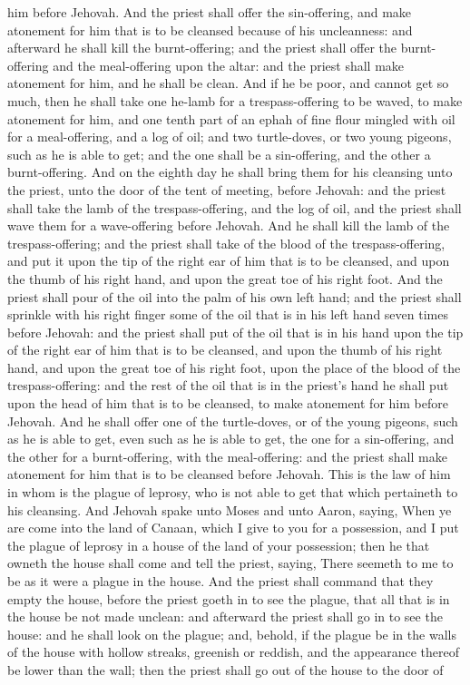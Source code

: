 him before Jehovah. And the priest shall offer the sin-offering, and make atonement for him that is to be cleansed because of his uncleanness: and afterward he shall kill the burnt-offering; and the priest shall offer the burnt-offering and the meal-offering upon the altar: and the priest shall make atonement for him, and he shall be clean.  And if he be poor, and cannot get so much, then he shall take one he-lamb for a trespass-offering to be waved, to make atonement for him, and one tenth part of an ephah of fine flour mingled with oil for a meal-offering, and a log of oil; and two turtle-doves, or two young pigeons, such as he is able to get; and the one shall be a sin-offering, and the other a burnt-offering. And on the eighth day he shall bring them for his cleansing unto the priest, unto the door of the tent of meeting, before Jehovah: and the priest shall take the lamb of the trespass-offering, and the log of oil, and the priest shall wave them for a wave-offering before Jehovah. And he shall kill the lamb of the trespass-offering; and the priest shall take of the blood of the trespass-offering, and put it upon the tip of the right ear of him that is to be cleansed, and upon the thumb of his right hand, and upon the great toe of his right foot. And the priest shall pour of the oil into the palm of his own left hand; and the priest shall sprinkle with his right finger some of the oil that is in his left hand seven times before Jehovah: and the priest shall put of the oil that is in his hand upon the tip of the right ear of him that is to be cleansed, and upon the thumb of his right hand, and upon the great toe of his right foot, upon the place of the blood of the trespass-offering: and the rest of the oil that is in the priest’s hand he shall put upon the head of him that is to be cleansed, to make atonement for him before Jehovah. And he shall offer one of the turtle-doves, or of the young pigeons, such as he is able to get, even such as he is able to get, the one for a sin-offering, and the other for a burnt-offering, with the meal-offering: and the priest shall make atonement for him that is to be cleansed before Jehovah. This is the law of him in whom is the plague of leprosy, who is not able to get that which pertaineth to his cleansing.  And Jehovah spake unto Moses and unto Aaron, saying, When ye are come into the land of Canaan, which I give to you for a possession, and I put the plague of leprosy in a house of the land of your possession; then he that owneth the house shall come and tell the priest, saying, There seemeth to me to be as it were a plague in the house. And the priest shall command that they empty the house, before the priest goeth in to see the plague, that all that is in the house be not made unclean: and afterward the priest shall go in to see the house: and he shall look on the plague; and, behold, if the plague be in the walls of the house with hollow streaks, greenish or reddish, and the appearance thereof be lower than the wall; then the priest shall go out of the house to the door of 